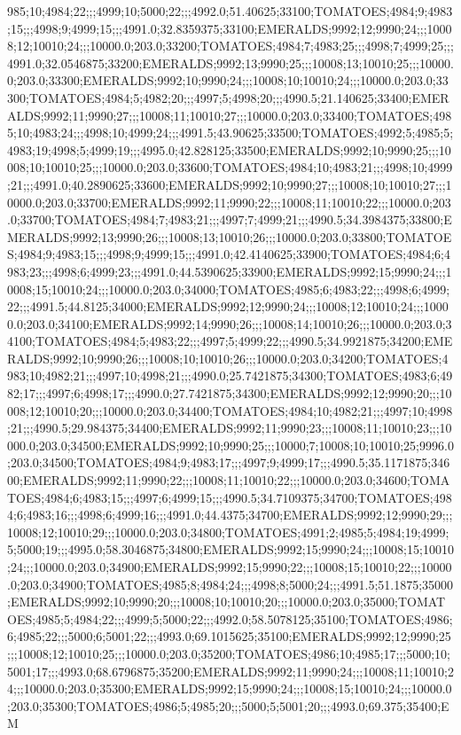985;10;4984;22;;;4999;10;5000;22;;;4992.0;51.40625;33100;TOMATOES;4984;9;4983;15;;;4998;9;4999;15;;;4991.0;32.8359375;33100;EMERALDS;9992;12;9990;24;;;10008;12;10010;24;;;10000.0;203.0;33200;TOMATOES;4984;7;4983;25;;;4998;7;4999;25;;;4991.0;32.0546875;33200;EMERALDS;9992;13;9990;25;;;10008;13;10010;25;;;10000.0;203.0;33300;EMERALDS;9992;10;9990;24;;;10008;10;10010;24;;;10000.0;203.0;33300;TOMATOES;4984;5;4982;20;;;4997;5;4998;20;;;4990.5;21.140625;33400;EMERALDS;9992;11;9990;27;;;10008;11;10010;27;;;10000.0;203.0;33400;TOMATOES;4985;10;4983;24;;;4998;10;4999;24;;;4991.5;43.90625;33500;TOMATOES;4992;5;4985;5;4983;19;4998;5;4999;19;;;4995.0;42.828125;33500;EMERALDS;9992;10;9990;25;;;10008;10;10010;25;;;10000.0;203.0;33600;TOMATOES;4984;10;4983;21;;;4998;10;4999;21;;;4991.0;40.2890625;33600;EMERALDS;9992;10;9990;27;;;10008;10;10010;27;;;10000.0;203.0;33700;EMERALDS;9992;11;9990;22;;;10008;11;10010;22;;;10000.0;203.0;33700;TOMATOES;4984;7;4983;21;;;4997;7;4999;21;;;4990.5;34.3984375;33800;EMERALDS;9992;13;9990;26;;;10008;13;10010;26;;;10000.0;203.0;33800;TOMATOES;4984;9;4983;15;;;4998;9;4999;15;;;4991.0;42.4140625;33900;TOMATOES;4984;6;4983;23;;;4998;6;4999;23;;;4991.0;44.5390625;33900;EMERALDS;9992;15;9990;24;;;10008;15;10010;24;;;10000.0;203.0;34000;TOMATOES;4985;6;4983;22;;;4998;6;4999;22;;;4991.5;44.8125;34000;EMERALDS;9992;12;9990;24;;;10008;12;10010;24;;;10000.0;203.0;34100;EMERALDS;9992;14;9990;26;;;10008;14;10010;26;;;10000.0;203.0;34100;TOMATOES;4984;5;4983;22;;;4997;5;4999;22;;;4990.5;34.9921875;34200;EMERALDS;9992;10;9990;26;;;10008;10;10010;26;;;10000.0;203.0;34200;TOMATOES;4983;10;4982;21;;;4997;10;4998;21;;;4990.0;25.7421875;34300;TOMATOES;4983;6;4982;17;;;4997;6;4998;17;;;4990.0;27.7421875;34300;EMERALDS;9992;12;9990;20;;;10008;12;10010;20;;;10000.0;203.0;34400;TOMATOES;4984;10;4982;21;;;4997;10;4998;21;;;4990.5;29.984375;34400;EMERALDS;9992;11;9990;23;;;10008;11;10010;23;;;10000.0;203.0;34500;EMERALDS;9992;10;9990;25;;;10000;7;10008;10;10010;25;9996.0;203.0;34500;TOMATOES;4984;9;4983;17;;;4997;9;4999;17;;;4990.5;35.1171875;34600;EMERALDS;9992;11;9990;22;;;10008;11;10010;22;;;10000.0;203.0;34600;TOMATOES;4984;6;4983;15;;;4997;6;4999;15;;;4990.5;34.7109375;34700;TOMATOES;4984;6;4983;16;;;4998;6;4999;16;;;4991.0;44.4375;34700;EMERALDS;9992;12;9990;29;;;10008;12;10010;29;;;10000.0;203.0;34800;TOMATOES;4991;2;4985;5;4984;19;4999;5;5000;19;;;4995.0;58.3046875;34800;EMERALDS;9992;15;9990;24;;;10008;15;10010;24;;;10000.0;203.0;34900;EMERALDS;9992;15;9990;22;;;10008;15;10010;22;;;10000.0;203.0;34900;TOMATOES;4985;8;4984;24;;;4998;8;5000;24;;;4991.5;51.1875;35000;EMERALDS;9992;10;9990;20;;;10008;10;10010;20;;;10000.0;203.0;35000;TOMATOES;4985;5;4984;22;;;4999;5;5000;22;;;4992.0;58.5078125;35100;TOMATOES;4986;6;4985;22;;;5000;6;5001;22;;;4993.0;69.1015625;35100;EMERALDS;9992;12;9990;25;;;10008;12;10010;25;;;10000.0;203.0;35200;TOMATOES;4986;10;4985;17;;;5000;10;5001;17;;;4993.0;68.6796875;35200;EMERALDS;9992;11;9990;24;;;10008;11;10010;24;;;10000.0;203.0;35300;EMERALDS;9992;15;9990;24;;;10008;15;10010;24;;;10000.0;203.0;35300;TOMATOES;4986;5;4985;20;;;5000;5;5001;20;;;4993.0;69.375;35400;EM